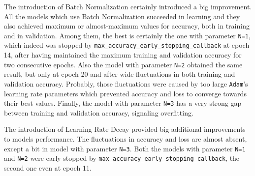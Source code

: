 \documentclass{article}
\begin{document}
The introduction of Batch Normalization certainly introduced a big improvement.
All the models which use Batch Normalization succeeded in learning and they also achieved maximum or almost-maximum values for accuracy, both in training and in validation.
Among them, the best is certainly the one with parameter \texttt{N=1}, which indeed was stopped by \texttt{max\_accuracy\-\_early\-\_stopping\-\_callback} at epoch 14, after having maintained the maximum training and validation accuracy for two consecutive epochs.
Also the model with parameter \texttt{N=2} obtained the same result, but only at epoch 20 and after wide fluctuations in both training and validation accuracy.
Probably, those fluctuations were caused by too large \texttt{Adam}'s learning rate parameters which prevented accuracy and loss to converge towards their best values.
Finally, the model with parameter \texttt{N=3} has a very strong gap between training and validation accuracy, signaling overfitting.

The introduction of Learning Rate Decay provided big additional improvements to models performance.
The fluctuations in accuracy and loss are almost absent, except a bit in model with parameter \texttt{N=3}.
Both the models with parameter \texttt{N=1} and \texttt{N=2} were early stopped by \texttt{max\_accuracy\-\_early\-\_stopping\-\_callback}, the second one even at epoch 11.
\end{document}
